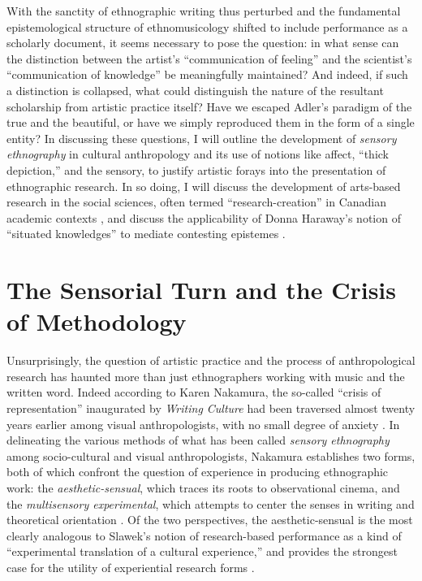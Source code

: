 With the sanctity of ethnographic writing thus perturbed and the
fundamental epistemological structure of ethnomusicology shifted to
include performance as a scholarly document, it seems necessary to pose
the question: in what sense can the distinction between the artist's
``communication of feeling'' and the scientist's ``communication of
knowledge'' be meaningfully maintained? And indeed, if such a
distinction is collapsed, what could distinguish the nature of the
resultant scholarship from artistic practice itself? Have we escaped
Adler's paradigm of the true and the beautiful, or have we simply
reproduced them in the form of a single entity? In discussing these
questions, I will outline the development of \emph{sensory ethnography}
in cultural anthropology and its use of notions like affect, ``thick
depiction,'' and the sensory, to justify artistic forays into the
presentation of ethnographic research. In so doing, I will discuss the
development of arts-based research in the social sciences, often termed
``research-creation'' in Canadian academic contexts
\autocite{chapman_research-creation:_2012}, and discuss the
applicability of Donna Haraway's notion of ``situated knowledges'' to
mediate contesting epistemes \autocite*{haraway_situated_1988}.

\hypertarget{the-sensorial-turn-and-the-crisis-of-methodology}{%
\section{The Sensorial Turn and the Crisis of
Methodology}\label{the-sensorial-turn-and-the-crisis-of-methodology}}

Unsurprisingly, the question of artistic practice and the process of
anthropological research has haunted more than just ethnographers
working with music and the written word. Indeed according to Karen
Nakamura, the so-called ``crisis of representation'' inaugurated by
\emph{Writing Culture} had been traversed almost twenty years earlier
among visual anthropologists, with no small degree of anxiety
\autocite*[133]{nakamura_making_2013}. In delineating the various
methods of what has been called \emph{sensory ethnography} among
socio-cultural and visual anthropologists, Nakamura establishes two
forms, both of which confront the question of experience in producing
ethnographic work: the \emph{aesthetic-sensual}, which traces its roots
to observational cinema, and the \emph{multisensory experimental}, which
attempts to center the senses in writing and theoretical orientation
\autocite*[133-135]{nakamura_making_2013}. Of the two perspectives, the
aesthetic-sensual is the most clearly analogous to Slawek's notion of
research-based performance as a kind of ``experimental translation of a
cultural experience,'' and provides the strongest case for the utility
of experiential research forms \autocite*[22]{slawek_study_1994}.

